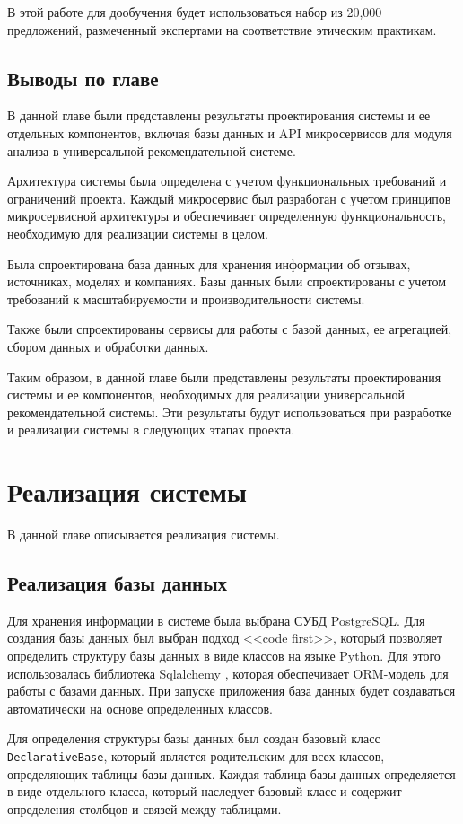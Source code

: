 \documentclass[PI, VKR]{HSEUniversity}
\begin{document}
В этой работе для дообучения будет использоваться набор из 20,000 предложений, размеченный экспертами на соответствие этическим практикам.
\section{Выводы по главе}
\label{sec:orgc3f2cf9}
В данной главе были представлены результаты проектирования системы и ее отдельных компонентов, включая базы данных и API микросервисов для модуля анализа в универсальной рекомендательной системе.

Архитектура системы была определена с учетом функциональных требований и ограничений проекта. Каждый микросервис был разработан с учетом принципов микросервисной архитектуры и обеспечивает определенную функциональность, необходимую для реализации системы в целом.

Была спроектирована база данных для хранения информации об отзывах, источниках, моделях и компаниях. Базы данных были спроектированы с учетом требований к масштабируемости и производительности системы.

Также были спроектированы сервисы для работы с базой данных, ее агрегацией, сбором данных и обработки данных.

Таким образом, в данной главе были представлены результаты проектирования системы и ее компонентов, необходимых для реализации универсальной рекомендательной системы. Эти результаты будут использоваться при разработке и реализации системы в следующих этапах проекта.
\chapter{Реализация системы}
\label{sec:org26729bb}
В данной главе описывается реализация системы.
\section{Реализация базы данных}
\label{sec:org4009567}
Для хранения информации в системе была выбрана СУБД PostgreSQL. Для создания базы данных был выбран подход {}<<code first>>{}, который позволяет определить структуру базы данных в виде классов на языке Python. Для этого использовалась библиотека Sqlalchemy \autocite{bayermichael_architecture_2012}, которая обеспечивает ORM-модель для работы с базами данных. При запуске приложения база данных будет создаваться автоматически на основе определенных классов.

Для определения структуры базы данных был создан базовый класс \texttt{DeclarativeBase}, который является родительским для всех классов, определяющих таблицы базы данных. Каждая таблица базы данных определяется в виде отдельного класса, который наследует базовый класс и содержит определения столбцов и связей между таблицами.
\end{document}
